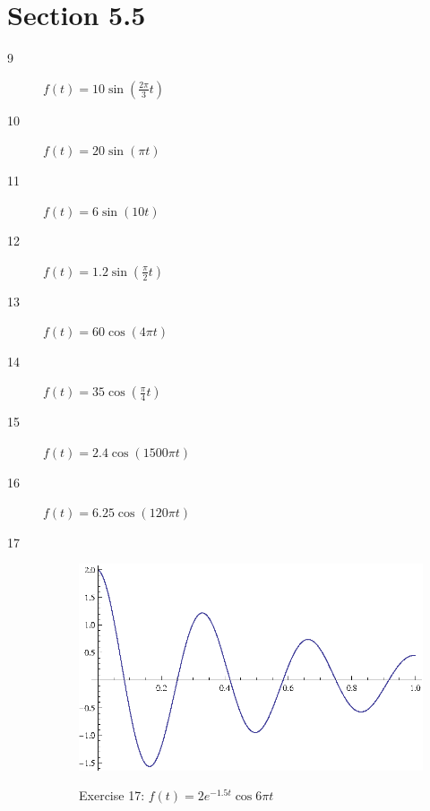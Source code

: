 \documentclass{exam}
\begin{document}
    \section{Section 5.5}
    \begin{description}
      \item[9] $f(t) = 10 \sin \left( \frac{2 \pi}{3} t \right)$

      \item[10] $f(t) = 20 \sin \left( \pi t \right)$

      \item[11] $f(t) = 6 \sin \left( 10 t \right)$

      \item[12] $f(t) = 1.2 \sin \left( \frac{\pi}{2} t \right)$
        
      \item[13] $f(t) = 60 \cos \left( 4 \pi t \right)$

      \item[14] $f(t) = 35 \cos \left( \frac{\pi}{4} t \right)$

      \item[15] $f(t) = 2.4 \cos \left( 1500 \pi t \right)$

      \item[16] $f(t) = 6.25 \cos \left( 120 \pi t \right)$

      \item[17]
        \begin{figure}[H]
          \centering
          \includegraphics{exercise17.eps}

          Exercise 17: $f(t) = 2 e^{-1.5t} \cos 6 \pi t$
        \end{figure}


\end{description}
\end{document}
